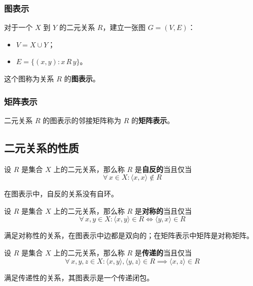\subsubsection{图表示}

对于一个 $X$ 到 $Y$ 的二元关系 $R$，建立一张图 $G = (V, E)$：

\begin{itemize}
    \item $V = X \cup Y$；
    \item $E = \{(x, y): x \, R \, y\}$。
\end{itemize}

这个图称为关系 $R$ 的\textbf{图表示}。

\subsubsection{矩阵表示}

二元关系 $R$ 的图表示的邻接矩阵称为 $R$ 的\textbf{矩阵表示}。

\subsection{二元关系的性质}

\begin{definition}[自反性]
    设 $R$ 是集合 $X$ 上的二元关系，那么称 $R$ 是\textbf{自反的}当且仅当
    $$
    \forall\,x \in X: \langle x, x \rangle \notin R
    $$
\end{definition}

在图表示中，自反的关系没有自环。

\begin{definition}[对称性]
    设 $R$ 是集合 $X$ 上的二元关系，那么称 $R$ 是\textbf{对称的}当且仅当
    $$
    \forall\,x, y \in X: \langle x, y \rangle \in R \iff \langle y, x \rangle \in R
    $$
\end{definition}

满足对称性的关系，在图表示中边都是双向的；在矩阵表示中矩阵是对称矩阵。

\begin{definition}[传递性]
    设 $R$ 是集合 $X$ 上的二元关系，那么称 $R$ 是\textbf{传递的}当且仅当
    $$
    \forall\,x, y, z \in X: \langle x, y \rangle, \langle y, z \rangle \in R \implies \langle x, z \rangle \in R
    $$
\end{definition}

满足传递性的关系，其图表示是一个传递闭包。
